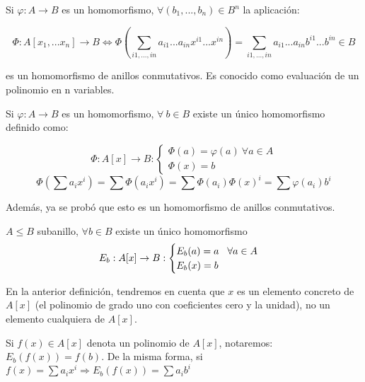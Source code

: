 \begin{nprop}

Si $\varphi :A \to B$ es un homomorfismo, $\forall(b_1,...,b_n) \in B^n$ la aplicación:

\[
\Phi:A[x_1,...x_n] \to B \iff \Phi\left(\sum_{i1,...,in}a_{i1}...a_{in}x^{i1}... x^{in}\right) = \sum_{i1,...,in}a_{i1}...a_{in}b^{i1}... b^{in} \in B
\]

es un homomorfismo de anillos conmutativos. Es conocido como evaluación de un polinomio en n variables.

\end{nprop}



\begin{nprop}
	Si $\varphi:A \to B$ es un homomorfismo, $\forall\  b \in B$ existe un único homomorfismo definido como:

\[
\Phi:A[x] \to B : \begin{cases}
	\Phi(a) = \varphi(a)\ \forall a \in A \\
	\Phi(x) = b
\end{cases}
\]
\[
\Phi\left(\sum a_i x^i\right) = \sum \Phi(a_i x^i) =  \sum \Phi(a_i) \Phi(x)^i = \sum \varphi(a_i) b^i
\]

Además, ya se probó que esto es un homomorfismo de anillos conmutativos.

\end{nprop}

\begin{ncor}
	$A \leq B$ subanillo, $\forall b \in B$ existe un único homomorfismo
\[
E_b: A[x] \to B: \begin{cases}
E_b(a) = a \hspace{0.3cm} \forall a \in A\\
E_b(x) = b

\end{cases}
\]
\end{ncor}

\begin{nota}
	En la anterior definición, tendremos en cuenta que $x$ es un elemento concreto de $A[x]$ (el polinomio de grado uno con coeficientes cero y la unidad), no un elemento cualquiera de $A[x]$.
\end{nota}

\begin{nota}
	Si $f(x)\in A[x]$ denota un polinomio de $A[x]$, notaremos: $E_b(f(x)) = f(b)$.
	De la misma forma, si $f(x) = \sum a_i x^i \Rightarrow E_b(f(x)) = \sum a_i b^i$
\end{nota}


